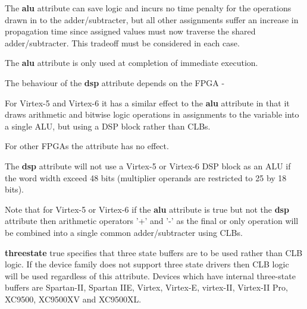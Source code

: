         The {\bf alu} attribute can save logic and incurs no time penalty for the
        operations drawn in to the adder/subtracter, but all other assignments
        suffer an increase in propagation time since assigned values must now
        traverse the shared adder/subtracter. This tradeoff must be considered
        in each case.
        
        The {\bf alu} attribute is only used at completion of immediate execution.
        
        The behaviour of the {\bf dsp} attribute depends on the FPGA -
        \blist
        \item   For Virtex-5 and Virtex-6 it has a similar effect to the
                {\bf alu} attribute in that it draws arithmetic and bitwise logic
                operations in assignments to the variable into a single ALU,
                but using a DSP block rather than CLBs.
        \item   For other FPGAs the attribute has no effect.
        \blend
        
        The {\bf dsp} attribute will not use a Virtex-5 or Virtex-6 DSP block as an
        ALU if the word width exceed 48 bits (multiplier operands are restricted
        to 25 by 18 bits).
        
        Note that for Virtex-5 or Virtex-6 if the {\bf alu} attribute is true but not
        the {\bf dsp} attribute then arithmetic operators '+' and '-' as the final or
        only operation will be combined into a single common adder/subtracter
        using CLBs.
        
        {\bf threestate} true specifies that three state buffers are to be used
        rather than CLB logic. If the device family does not support three state
        drivers then CLB logic will be used regardless of this attribute.
        Devices which have internal three-state buffers are Spartan-II, Spartan
        IIE, Virtex, Virtex-E, virtex-II, Virtex-II Pro, XC9500, XC9500XV and
        XC9500XL.
